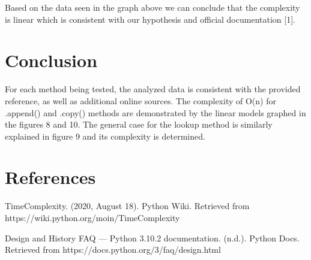 \documentclass[12pt]{article}
\begin{document}
Based on the data seen in the graph above we can conclude that the complexity is linear which is consistent with our hypothesis and official documentation [1].

\section{Conclusion}

For each method being tested, the analyzed data is consistent with the provided reference, as well as additional online sources. The complexity of O(n) for .append() and .copy() methods are demonstrated by the linear models graphed in the figures 8 and 10. The general case for the lookup method is similarly explained in figure 9 and its complexity is determined.

\newpage\section*{References}
\begin{enumerate}[label={[\arabic*]}]
\item	TimeComplexity. (2020, August 18). Python Wiki. Retrieved from \newline https://wiki.python.org/moin/TimeComplexity
\item	Design and History FAQ — Python 3.10.2 documentation. (n.d.). Python Docs. Retrieved from https://docs.python.org/3/faq/design.html
\end{enumerate}
\end{document}
